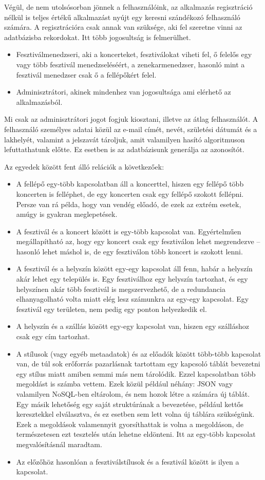 Végül, de nem utolsósorban jönnek a felhasználóink, az alkalmazás regisztráció nélkül is teljes értékű alkalmazást nyújt egy keresni szándékozó felhasználó számára. A regisztrációra csak annak van szüksége, aki fel szeretne vinni az adatbázisba rekordokat. Itt több jogosultság is  felmerülhet.
\begin{itemize}
\item Fesztiválmenedzseri, aki a koncerteket, fesztiválokat viheti fel, ő felelős egy vagy több fesztivál menedzseléséért, a zenekarmenedzser, hasonló mint a fesztivál menedzser csak ő a fellépőkért felel.
\item Adminisztrátori, akinek mindenhez van jogosultsága ami elérhető az alkalmazásból.
\end{itemize}
Mi csak az adminisztrátori jogot fogjuk kiosztani, illetve az átlag felhasználót. A felhasználó személyes adatai közül az e-mail címét, nevét, születési dátumát és a lakhelyét, valamint a jelszavát tároljuk, amit valamilyen hasító algoritmuson lefuttathatunk előtte. Ez esetben is az adatbázisunk generálja az azonosítót.

Az egyedek között fent álló relációk a következőek:
\begin{itemize}
\item A fellépő egy-több kapcsolatban áll a koncerttel, hiszen egy fellépő több koncerten is felléphet, de egy koncerten csak egy fellépő szokott fellépni. Persze van rá példa, hogy van vendég előadó, de ezek az extrém esetek, amúgy is gyakran meglepetések.
\item A fesztivál és a koncert között is egy-több kapcsolat van. Egyértelműen megállapítható az, hogy egy koncert csak egy fesztiválon lehet megrendezve -- hasonló lehet máshol is, de egy fesztiválon több koncert is szokott lenni.
\item A fesztivál és a helyszín között egy-egy kapcsolat áll fenn, habár a helyszín akár lehet egy település is. Egy fesztiválhoz egy helyszín tartozhat, és egy helyszínen akár több fesztivál is megszervezhető, de a redundancia elhanyagolható volta miatt elég lesz számunkra az egy-egy kapcsolat. Egy fesztivál egy területen, nem pedig egy ponton helyezkedik el.
\item A helyszín és a szállás között egy-egy kapcsolat van, hiszen egy szálláshoz csak egy cím tartozhat.
\item A stílusok (vagy egyéb metaadatok) és az előadók között több-több kapcsolat van, de túl sok erőforrás pazarlásnak tartottam egy kapcsoló táblát bevezetni egy stílus miatt amiben semmi más nem tárolódik. Ezzel kapcsolatban több megoldást is számba vettem. Ezek közül például néhány: JSON vagy valamilyen NoSQL-ben eltárolom, és nem hozok létre a számára új táblát. Egy másik lehetőség egy saját struktúrának a bevezetése, például kettős keresztekkel elválasztva, és ez esetben sem lett volna új táblára szükségünk. Ezek a megoldások valamennyit gyorsíthattak is volna a megoldáson, de természetesen ezt tesztelés után lehetne eldönteni. Itt az egy-több kapcsolat megvalósításnál maradtam.
\item Az előzőhöz hasonlóan a fesztiválstílusok és a fesztivál között is ilyen a kapcsolat.
\end{itemize}

